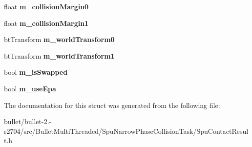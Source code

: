 \begin{DoxyCompactItemize}
\item 
\hypertarget{struct_spu_collision_pair_input_a7d21c1887cdb71a526d7ea79759ded7d}{float {\bfseries m\+\_\+collision\+Margin0}}\label{struct_spu_collision_pair_input_a7d21c1887cdb71a526d7ea79759ded7d}

\item 
\hypertarget{struct_spu_collision_pair_input_a3a515e9c9777d2f53b300a8ce5aaffa0}{float {\bfseries m\+\_\+collision\+Margin1}}\label{struct_spu_collision_pair_input_a3a515e9c9777d2f53b300a8ce5aaffa0}

\item 
\hypertarget{struct_spu_collision_pair_input_a5382f102fc5c2d7d8025ab9bb3dc0f11}{bt\+Transform {\bfseries m\+\_\+world\+Transform0}}\label{struct_spu_collision_pair_input_a5382f102fc5c2d7d8025ab9bb3dc0f11}

\item 
\hypertarget{struct_spu_collision_pair_input_a74c910d0cc7e0982c78e49c52d1150a3}{bt\+Transform {\bfseries m\+\_\+world\+Transform1}}\label{struct_spu_collision_pair_input_a74c910d0cc7e0982c78e49c52d1150a3}

\item 
\hypertarget{struct_spu_collision_pair_input_a0b5d64f3872d07a236dbb91072518499}{bool {\bfseries m\+\_\+is\+Swapped}}\label{struct_spu_collision_pair_input_a0b5d64f3872d07a236dbb91072518499}

\item 
\hypertarget{struct_spu_collision_pair_input_a7f1ea11d962827fccbd7862e9fe4915e}{bool {\bfseries m\+\_\+use\+Epa}}\label{struct_spu_collision_pair_input_a7f1ea11d962827fccbd7862e9fe4915e}

\end{DoxyCompactItemize}


The documentation for this struct was generated from the following file\+:\begin{DoxyCompactItemize}
\item 
bullet/bullet-\/2.-\/r2704/src/\+Bullet\+Multi\+Threaded/\+Spu\+Narrow\+Phase\+Collision\+Task/Spu\+Contact\+Result.\+h\end{DoxyCompactItemize}
